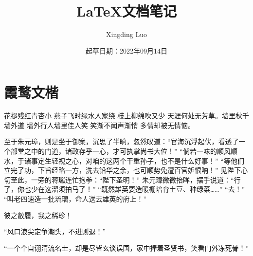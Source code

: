 \documentclass[12pt, letterpaper]{article}
\title{LaTeX文档笔记}
\author{Xingding Luo}
\date{起草日期：2022年09月14日}
\begin{document}
\begin{titlepage}
		\maketitle
\end{titlepage}
		\tableofcontents
		\section{霞鹜文楷}


		花褪残红青杏小 燕子飞时绿水人家绕 枝上柳绵吹又少 天涯何处无芳草。墙里秋千墙外道 墙外行人墙里佳人笑  笑渐不闻声渐悄 多情却被无情恼。

		至于朱元璋，则是坐于御案，沉思了半晌，忽然叹道：“官海沉浮起伏，看透了一个部堂之中的门道，诸政存乎一心，才可执掌尚书大位！”
		“倘若一味的顺风顺水，于诸事定生轻视之心，对咱的这两个干重孙子，也不是什么好事！”
		“等他们立完了功，下旨经略一方，洗去铅华之余，也可顺势免遭百官妒恨呐！”
		见陛下心切至此，一旁的蒋瓛连忙抱拳：“陛下圣明！”
		朱元璋微微抬眸，摆手说道：“行了，你也少在这溜须拍马了！”
		“既然雄英要造暖棚培育土豆、种绿菜……”
		“去！”
		“叫老四速造一批琉璃，命人送去雄英的府上！”

		彼之敝履，我之稀珍！

		“风口浪尖定争潮头，不进则退！”

		“一个个自诩清流名士，却是尽皆玄谈误国，家中捧着圣贤书，笑看门外冻死骨！”
\end{document}
